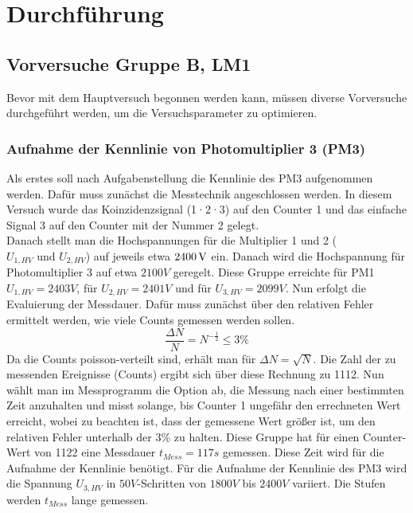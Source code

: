 \section{Durchführung}
    \subsection{Vorversuche Gruppe B, LM1}
        Bevor mit dem Hauptversuch begonnen werden kann, müssen diverse Vorversuche durchgeführt werden, um die Versuchsparameter zu optimieren.
        \subsubsection{Aufnahme der Kennlinie von Photomultiplier 3 (PM3)}
        Als erstes soll nach Aufgabenstellung die Kennlinie des PM3 aufgenommen werden. Dafür muss zunächst die Messtechnik angeschlossen werden. In diesem Versuch wurde das Koinzidenzsignal (1·2·3) auf den Counter 1 und das einfache Signal 3 auf den Counter mit der Nummer 2 gelegt.\\
        Danach stellt man die Hochspannungen für die Multiplier 1 und 2 ($U_{1,HV} \text{ und } U_{2,HV}$) auf jeweils etwa $\unit[2400]{V}$ ein. Danach wird die Hochspannung für Photomultiplier 3 auf etwa $2100\unit{V}$ geregelt. Diese Gruppe erreichte für PM1 $U_{1,HV} = 2403\unit{V}$, für $U_{2,HV} = 2401\unit{V}$ und für $U_{3,HV} = 2099\unit{V}$. 
        Nun erfolgt die Evaluierung der Messdauer. Dafür muss zunächst über den relativen Fehler ermittelt werden, wie viele Counts gemessen werden sollen. 
        $$ \frac{\Delta N}{N} = N^{-\frac{1}{2}} \leq 3\unit{\%}$$
        Da die Counts poisson-verteilt sind, erhält man für $\Delta N = \sqrt{N}$. Die Zahl der zu messenden Ereignisse (Counts) ergibt sich über diese Rechnung zu 1112. Nun wählt man im Messprogramm die Option ab, die Messung nach einer bestimmten Zeit anzuhalten und misst solange, bis Counter 1 ungefähr den errechneten Wert erreicht, wobei zu beachten ist, dass der gemessene Wert größer ist, um den relativen Fehler unterhalb der $3\unit{\%}$ zu halten. Diese Gruppe hat für einen Counter-Wert von 1122 eine Messdauer $t_{Mess} = 117\unit{s}$ gemessen. Diese Zeit wird für die Aufnahme der Kennlinie benötigt.
        Für die Aufnahme der Kennlinie des PM3 wird die Spannung $U_{3,HV}$ in $50\unit{V}$-Schritten von $1800\unit{V}$ bis $2400\unit{V}$ variiert. Die Stufen werden $t_{Mess}$ lange gemessen. 
